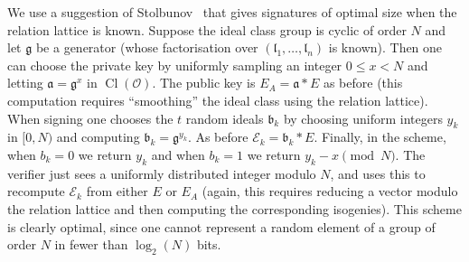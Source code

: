 \documentclass{llncs}
\newcommand{\D}{\mathcal{D}}
\newcommand{\E}{\mathcal{E}}
\newcommand{\FF}{\mathcal{F}}
\newcommand{\N}{\mathbb{N}}
\newcommand{\OO}{\mathcal{O}}
\newcommand{\Z}{\mathbb{Z}}
\DeclareMathOperator{\Cl}{Cl}
\renewcommand{\a}{\mathfrak{a}}
\renewcommand{\b}{\mathfrak{b}}
\renewcommand{\l}{\mathfrak{l}}
\newcommand{\g}{\mathfrak{g}}
\newcommand{\x}{\mathbf{x}}
\newcommand{\z}{\mathbf{z}}
\begin{document}










We use a suggestion of Stolbunov~\cite{Sto12} that gives signatures of optimal size when the relation lattice is known.
%
%
Suppose the ideal class group is cyclic of order $N$ and let $\g$ be a generator (whose factorisation over $( \l_1, \dots, \l_n )$ is known).
Then one can choose the private key by uniformly sampling an integer $0 \le x < N$ and letting $\a = \g^x$ in $\Cl(\OO)$.
The public key is $E_A = \a * E$ as before (this computation requires ``smoothing'' the ideal class using the relation lattice).
When signing one chooses the $t$ random ideals $\b_k$ by choosing uniform integers $y_k$ in $[0,N)$ and computing $\b_k = \g^{y_k}$.
As before $\E_k = \b_k * E$.
Finally, in the scheme, when $b_k = 0$ we return $y_k$ and when $b_k = 1$ we return $y_k - x \pmod{N}$.
The verifier just sees a uniformly distributed integer modulo $N$, and uses this to recompute $\E_k$ from either $E$ or $E_A$ (again, this requires reducing a vector modulo the relation lattice and then computing the corresponding isogenies).
This scheme is clearly optimal, since one cannot represent a random element of a group of order $N$ in fewer than $\log_2(N)$ bits.
\end{document}
